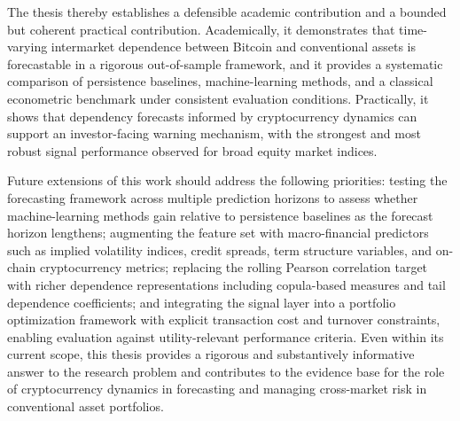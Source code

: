 The thesis thereby establishes a defensible academic contribution and a bounded but coherent practical contribution. Academically, it demonstrates that time-varying intermarket dependence between Bitcoin and conventional assets is forecastable in a rigorous out-of-sample framework, and it provides a systematic comparison of persistence baselines, machine-learning methods, and a classical econometric benchmark under consistent evaluation conditions. Practically, it shows that dependency forecasts informed by cryptocurrency dynamics can support an investor-facing warning mechanism, with the strongest and most robust signal performance observed for broad equity market indices.

Future extensions of this work should address the following priorities: testing the forecasting framework across multiple prediction horizons to assess whether machine-learning methods gain relative to persistence baselines as the forecast horizon lengthens; augmenting the feature set with macro-financial predictors such as implied volatility indices, credit spreads, term structure variables, and on-chain cryptocurrency metrics; replacing the rolling Pearson correlation target with richer dependence representations including copula-based measures and tail dependence coefficients; and integrating the signal layer into a portfolio optimization framework with explicit transaction cost and turnover constraints, enabling evaluation against utility-relevant performance criteria. Even within its current scope, this thesis provides a rigorous and substantively informative answer to the research problem and contributes to the evidence base for the role of cryptocurrency dynamics in forecasting and managing cross-market risk in conventional asset portfolios.
